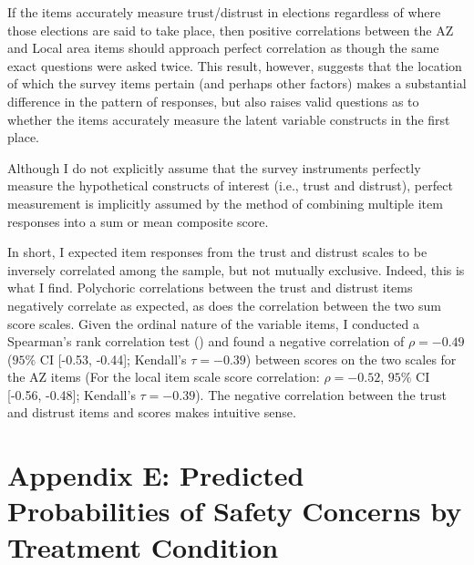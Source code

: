 \documentclass[
  12pt,
  letterpaper,
]{article}
\begin{document}
If the items accurately measure trust/distrust in elections regardless
of where those elections are said to take place, then positive
correlations between the AZ and Local area items should approach perfect
correlation as though the same exact questions were asked twice. This
result, however, suggests that the location of which the survey items
pertain (and perhaps other factors) makes a substantial difference in
the pattern of responses, but also raises valid questions as to whether
the items accurately measure the latent variable constructs in the first
place.

Although I do not explicitly assume that the survey instruments
perfectly measure the hypothetical constructs of interest (i.e., trust
and distrust), perfect measurement is implicitly assumed by the method
of combining multiple item responses into a sum or mean composite score.

In short, I expected item responses from the trust and distrust scales
to be inversely correlated among the sample, but not mutually exclusive.
Indeed, this is what I find. Polychoric correlations between the trust
and distrust items negatively correlate as expected, as does the
correlation between the two sum score scales. Given the ordinal nature
of the variable items, I conducted a Spearman's rank correlation test
() and found a negative
correlation of \(\rho = -0.49\) (\(95\%\) CI {[}-0.53, -0.44{]};
Kendall's \(\tau = -0.39\)) between scores on the two scales for the AZ
items (For the local item scale score correlation: \(\rho = -0.52\),
\(95\%\) CI {[}-0.56, -0.48{]}; Kendall's \(\tau = -0.39\)). The
negative correlation between the trust and distrust items and scores
makes intuitive sense.

\newpage{}

\section{Appendix E: Predicted Probabilities of Safety Concerns by
Treatment
Condition}\label{appendix-e-predicted-probabilities-of-safety-concerns-by-treatment-condition}
\end{document}

